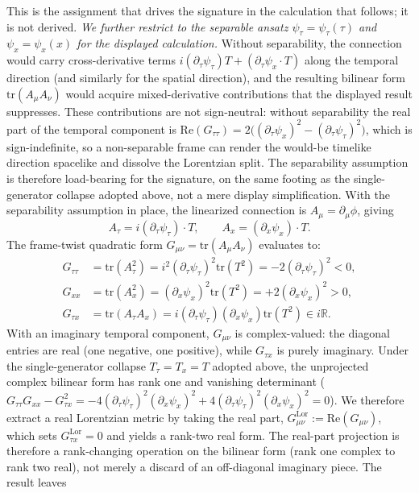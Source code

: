 \documentclass[11pt]{article}
\begin{document}
This is the assignment that drives the signature in the calculation that follows; it is not derived. \emph{We further restrict to the separable ansatz $\psi_\tau = \psi_\tau(\tau)$ and $\psi_x = \psi_x(x)$ for the displayed calculation.} Without separability, the connection would carry cross-derivative terms $i(\partial_\tau \psi_\tau)T + (\partial_\tau \psi_x \cdot T)$ along the temporal direction (and similarly for the spatial direction), and the resulting bilinear form $\mathrm{tr}(A_\mu A_\nu)$ would acquire mixed-derivative contributions that the displayed result suppresses. These contributions are not sign-neutral: without separability the real part of the temporal component is $\mathrm{Re}(G_{\tau\tau}) = 2\big((\partial_\tau \psi_x)^2 - (\partial_\tau \psi_\tau)^2\big)$, which is sign-indefinite, so a non-separable frame can render the would-be timelike direction spacelike and dissolve the Lorentzian split. The separability assumption is therefore load-bearing for the signature, on the same footing as the single-generator collapse adopted above, not a mere display simplification. With the separability assumption in place, the linearized connection is $A_\mu = \partial_\mu \phi$, giving
\begin{equation}
A_\tau = i(\partial_\tau \psi_\tau) \cdot T, \qquad A_x = (\partial_x \psi_x) \cdot T.
\end{equation}
The frame-twist quadratic form $G_{\mu\nu} = \mathrm{tr}(A_\mu A_\nu)$ evaluates to:
\begin{align}
G_{\tau\tau} &= \mathrm{tr}(A_\tau^2) = i^2 (\partial_\tau \psi_\tau)^2 \mathrm{tr}(T^2) = -2(\partial_\tau \psi_\tau)^2 < 0, \\
G_{xx} &= \mathrm{tr}(A_x^2) = (\partial_x \psi_x)^2 \mathrm{tr}(T^2) = +2(\partial_x \psi_x)^2 > 0, \\
G_{\tau x} &= \mathrm{tr}(A_\tau A_x) = i(\partial_\tau \psi_\tau)(\partial_x \psi_x)\mathrm{tr}(T^2) \in i\mathbb{R}.
\end{align}
With an imaginary temporal component, $G_{\mu\nu}$ is complex-valued: the diagonal entries are real (one negative, one positive), while $G_{\tau x}$ is purely imaginary. Under the single-generator collapse $T_\tau = T_x = T$ adopted above, the unprojected complex bilinear form has rank one and vanishing determinant ($G_{\tau\tau} G_{xx} - G_{\tau x}^2 = -4(\partial_\tau\psi_\tau)^2(\partial_x\psi_x)^2 + 4(\partial_\tau\psi_\tau)^2(\partial_x\psi_x)^2 = 0$). We therefore extract a real Lorentzian metric by taking the real part, $G^{\mathrm{Lor}}_{\mu\nu} := \mathrm{Re}(G_{\mu\nu})$, which sets $G^{\mathrm{Lor}}_{\tau x} = 0$ and yields a rank-two real form. The real-part projection is therefore a rank-changing operation on the bilinear form (rank one complex to rank two real), not merely a discard of an off-diagonal imaginary piece. The result leaves
\end{document}

